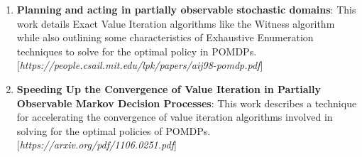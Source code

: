 \documentclass[12pt, draftcls, onecolumn]{IEEEtran}
\begin{document}
\begin{enumerate}
    \label{Ref. 17}
    \item \textbf{Planning and acting in partially observable stochastic domains}: This work details Exact Value Iteration algorithms like the Witness algorithm while also outlining some characteristics of Exhaustive Enumeration techniques to solve for the optimal policy in POMDPs.
    [\textit{https://people.csail.mit.edu/lpk/papers/aij98-pomdp.pdf}]\label{Ref. 18}
    \item \textbf{Speeding Up the Convergence of Value Iteration in Partially Observable Markov Decision Processes}: This work describes a technique for accelerating the convergence of value iteration algorithms involved in solving for the optimal policies of POMDPs.
    [\textit{https://arxiv.org/pdf/1106.0251.pdf}]\label{Ref. 19}
\end{enumerate}
\end{document}
